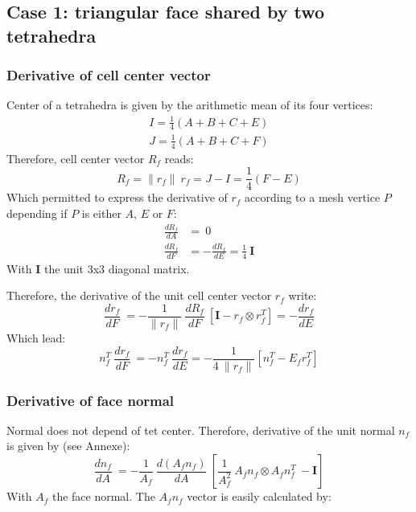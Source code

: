 \documentclass[11pt]{article}
\begin{document}
\subsection{Case 1: triangular face shared by two tetrahedra}

\subsubsection{Derivative of cell center vector}

Center of a tetrahedra is given by the arithmetic mean of its four vertices:
\begin{subequations}
\begin{gather}
I = \frac{1}{4} (A + B + C + E) \\
J = \frac{1}{4} (A + B + C + F)
\end{gather}
\end{subequations} 
Therefore, cell center vector $R_f$ reads:
\begin{equation}
R_f = \| r_f \|\ r_f = J-I = \frac{1}{4} (F - E)
\end{equation}
Which permitted to express the derivative of $r_f$ according to a mesh vertice $P$ depending if $P$ is either $A$, $E$ or $F$:
\begin{subequations}
\begin{align}
\frac{d R_f}{d A} &= \ 0 \\
\frac{d R_f}{d F} &= - \frac{d R_f}{d E} = \frac{1}{4}\ \boldsymbol{I}
\end{align}
\end{subequations} 
With $\boldsymbol{I}$ the unit 3x3 diagonal matrix.

Therefore, the derivative of the unit cell center vector $r_f$ write:
\begin{equation}
\frac{d r_f}{dF}\ = 
- \frac{1}{\| r_f \|}\ \frac{d R_f}{dF}\ \left[ \boldsymbol{I} - r_f \otimes r_f^T \right] = - \frac{d r_f}{dE}
\end{equation}
Which lead:
\begin{equation}
n_f^T\ \frac{d r_f}{dF}\ = - n_f^T\ \frac{d r_f}{dE} =
- \frac{1}{4\ \| r_f \|} \left[ n_f^T - E_f r_f^T \right]
\end{equation}


\subsubsection{Derivative of face normal}

Normal does not depend of tet center. Therefore, derivative of the unit normal $n_f$ is given by (see Annexe):
\begin{equation}
\frac{d n_f}{dA}\ = 
- \frac{1}{A_f}\ \frac{d (A_f n_f)}{dA}\ \left[ \frac{1}{A_f^2}\ A_f n_f \otimes A_f n_f^T\ - \boldsymbol{I}
\right]
\end{equation}
With $A_f$ the face normal. The $A_f n_f$ vector is easily calculated by:
\end{document}
